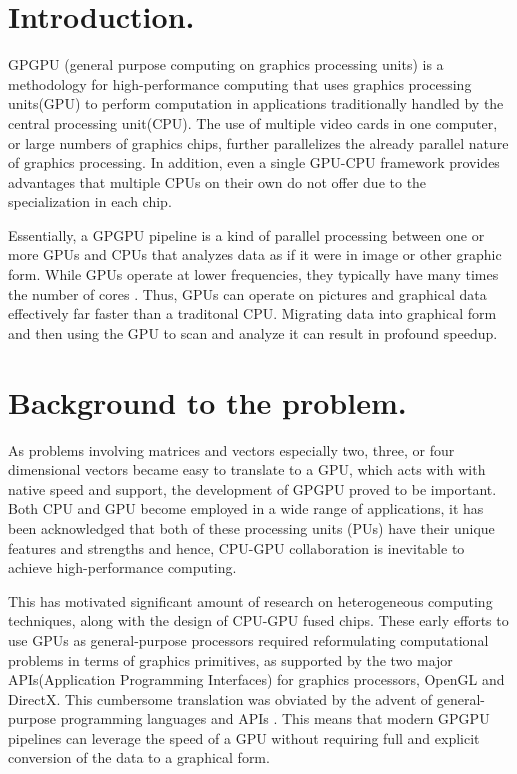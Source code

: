 \documentclass{article}
\begin{document}
\begin{large}\textbf{}\end{large}



\section{Introduction.}
{GPGPU (general purpose computing on graphics processing units) is a methodology for high-performance computing that uses graphics processing units(GPU) to perform computation in applications traditionally handled by the central processing unit(CPU).
 The use of multiple video cards in one computer, or large numbers of graphics chips, further parallelizes the already parallel nature of graphics processing. In addition, even a single GPU-CPU framework provides advantages that multiple CPUs on their own do not offer due to the specialization in each chip.

Essentially, a GPGPU pipeline is a kind of parallel processing between one or more GPUs and CPUs that analyzes data as if it were in image or other graphic form.  While GPUs operate at lower frequencies, they typically have many times the number of cores . Thus, GPUs can operate on pictures and graphical data effectively far faster than a traditonal CPU. Migrating data into graphical form and then using the GPU to scan and analyze it can result in profound speedup.

}

\section{Background to the problem.}
{As problems involving matrices and vectors especially two, three, or four dimensional vectors became easy to translate to a GPU, which acts with with native speed and support, the development of GPGPU proved to be important.
Both CPU and GPU become employed in a wide range of applications, it has been acknowledged
that both of these processing units (PUs) have their unique features and strengths and hence,
CPU-GPU collaboration is inevitable to achieve high-performance computing.

 This has motivated
significant amount of research on heterogeneous computing techniques, along with the design of
CPU-GPU fused chips. These early efforts to use GPUs as general-purpose processors required
reformulating computational problems in terms of graphics primitives, as supported by the two major
APIs(Application Programming Interfaces) for graphics processors, OpenGL and DirectX. This cumbersome translation was obviated by
the advent of general-purpose programming languages and APIs . This means that modern GPGPU pipelines can leverage the speed of a GPU without
requiring full and explicit conversion of the data to a graphical form.
}
\end{document}
